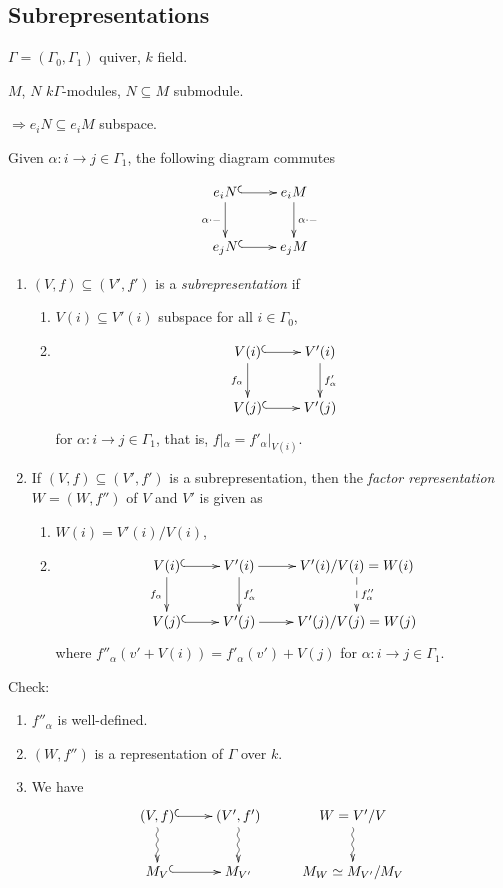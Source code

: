 \subsection{Subrepresentations}

$\Gamma = (\Gamma_0,\Gamma_1)$ quiver, $k$ field.

$M$, $N$ $k\Gamma$-modules, $N\subseteq M$ submodule.

$\Rightarrow e_iN\subseteq e_iM$ subspace.

Given $\alpha\colon i\to j \in \Gamma_1$, the following diagram commutes

\[\xymatrix{
e_i N \ar@{^(->}[r] \ar[d]_{\alpha\cdot-} & e_i M\ar[d]^{\alpha\cdot
  -}\\
e_jN \ar@{^(->}[r] & e_j M
}\]
\begin{defin}
\begin{enumerate}[\rm(a)]
\item $(V,f)\subseteq (V',f')$ is a
\emph{subrepresentation}
if
\begin{enumerate}[\rm(i)]
\item $V(i) \subseteq V'(i)$ subspace for all $i\in\Gamma_0$, 
\item \[\xymatrix{
V(i) \ar@{^(->}[r] \ar[d]_{f_\alpha} & V'(i)\ar[d]^{f'_\alpha}\\
V(j) \ar@{^(->}[r] & V'(j)}\]
for $\alpha\colon i\to j\in\Gamma_1$, that is, $f|_\alpha =
f'_\alpha|_{V(i)}$. 
\end{enumerate}
\item If $(V,f)\subseteq (V',f')$ is a subrepresentation, then the
  \emph{factor representation} $W=(W,f'')$ of $V$ and $V'$ is given as
\begin{enumerate}[\rm(i)] 
\item $W(i) = V'(i)/V(i)$, 
\item \[\xymatrix{
V(i) \ar@{^(->}[r] \ar[d]_{f_\alpha} & V'(i)\ar[d]^{f'_\alpha}\ar[r] & V'(i)/V(i)=W(i)\ar@{-->}[d]^{f''_\alpha} \\
V(j) \ar@{^(->}[r] & V'(j) \ar[r] & V'(j)/V(j)=W(j)}\]
where $f''_\alpha(v' + V(i)) = f'_\alpha(v') + V(j)$ for $\alpha\colon
i\to j\in\Gamma_1$. 
\end{enumerate}
\end{enumerate}
\end{defin}
Check: 
\begin{enumerate}[\rm(i)]
\item $f''_{\alpha}$ is well-defined.
\item $(W,f'')$ is a representation of ${\Gamma}$ over $k$. 
\item We have
\[\xymatrix{
(V,f) \ar@{^(->}[r]\ar@{~>}[d] & (V',f') \ar@{~>}[d]&  W = V'/V \ar@{~>}[d] \\
M_V \ar@{^(->}[r] & M_{V'} & M_W \simeq M_{V'}/M_V
}\]
\end{enumerate}

